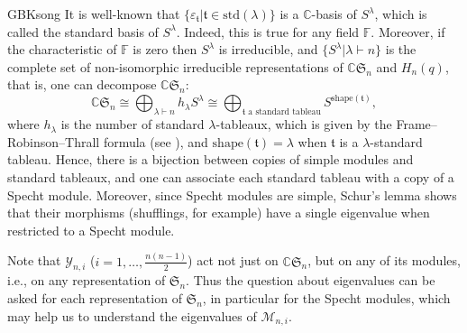 \documentclass[13pt,a4paper, oneside]{amsart}       %
\numberwithin{equation}{section}
\theoremstyle{definition}
\theoremstyle{remark}
\begin{document}
\begin{CJK*}{GBK}{song}
It is well-known that $\{\varepsilon_{\mathfrak{t}}|\mathfrak{t}\in\mathrm{std}(\lambda)\}$ is a $\mathbb{C}$-basis of $S^{\lambda}$, which is called the standard basis of $S^{\lambda}$. Indeed, this is true for any field $\mathbb{F}$. Moreover, if the characteristic of $\mathbb{F}$ is zero then $S^{\lambda}$ is irreducible, and $\{S^{\lambda}|\lambda\vdash n\}$ is the complete set of non-isomorphic irreducible representations of $\mathbb{C}\mathfrak{S}_n$ and $H_n(q)$, that is, one can
decompose $\mathbb{C}\mathfrak{S}_n$:
\begin{equation}\label{Equ:Sn-decom-module}
 \mathbb{C}\mathfrak{S}_n\cong \bigoplus_{\lambda\vdash n}
 h_{\lambda}S^{\lambda}\cong \bigoplus_{ \mathfrak{t}\text{ a standard tableau}} S^{\mathrm{shape}(\mathfrak{t})},
\end{equation}
where $h_{\lambda}$ is the number of standard $\lambda$-tableaux, which is given by the Frame--Robinson--Thrall formula (see \cite{Frame-RT}), and $\mathrm{shape}(\mathfrak{t})=\lambda$ when $\mathfrak{t}$ is a $\lambda$-standard tableau.
Hence, there is a bijection between copies of simple modules and
standard tableaux, and one can associate each
standard tableau with a copy of a Specht module. Moreover, since Specht modules are simple, Schur's lemma shows that their morphisms (shufflings, for example) have a single eigenvalue when restricted to a Specht module.

Note that $\mathscr{Y}_{n,i}$ ($i=1,\ldots, \frac{n(n-1)}{2}$)
act not just on $\mathbb{C}\mathfrak{S}_n$, but on any of its modules, i.e., on any representation of $\mathfrak{S}_n$. Thus the question about eigenvalues can be asked for each
representation of $\mathfrak{S}_n$, in particular for the Specht modules, which may help us to understand the eigenvalues of $\mathscr{M}_{n,i}$.



\end{CJK*}
\end{document}
